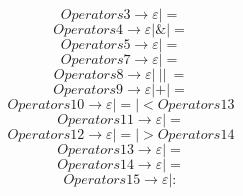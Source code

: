 \documentclass{article}
\begin{document}
\begin{equation}
	Operators3 \rightarrow \varepsilon | =
\end{equation}
\begin{equation}
	Operators4 \rightarrow \varepsilon | \& | =
\end{equation}
\begin{equation}
	Operators5 \rightarrow \varepsilon | =
\end{equation}
\begin{equation}
	Operators7 \rightarrow \varepsilon | =
\end{equation}
\begin{equation}
	Operators8 \rightarrow \varepsilon | \ | | \ =
\end{equation}
\begin{equation}
	Operators9 \rightarrow \varepsilon | + | =
\end{equation}
\begin{equation}
	Operators10 \rightarrow \varepsilon | = | < Operators13
\end{equation}
\begin{equation}
	Operators11 \rightarrow \varepsilon | =
\end{equation}
\begin{equation}
	Operators12 \rightarrow \varepsilon | = | > Operators14
\end{equation}
\begin{equation}
	Operators13 \rightarrow \varepsilon | =
\end{equation}
\begin{equation}
	Operators14 \rightarrow \varepsilon | =
\end{equation}
\begin{equation}
	Operators15 \rightarrow \varepsilon | \colon
\end{equation}
\end{document}
